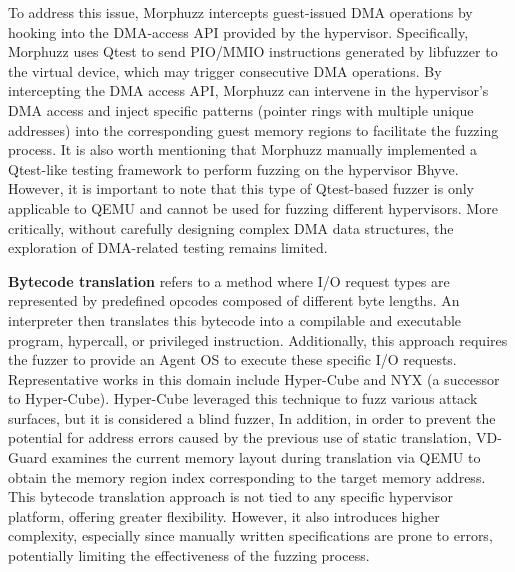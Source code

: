 \sloppy
To address this issue, Morphuzz \cite{bulekov2022morphuzz} intercepts guest-issued DMA operations by hooking into the DMA-access API provided by the hypervisor. Specifically, Morphuzz uses Qtest to send PIO/MMIO instructions generated by libfuzzer to the virtual device, which may trigger consecutive DMA operations. By intercepting the DMA access API, Morphuzz can intervene in the hypervisor's DMA access and inject specific patterns (\eg pointer rings with multiple unique addresses) into the corresponding guest memory regions to facilitate the fuzzing process. It is also worth mentioning that Morphuzz manually implemented a Qtest-like testing framework to perform fuzzing on the hypervisor Bhyve. 
However, it is important to note that this type of Qtest-based fuzzer is only applicable to QEMU and cannot be used for fuzzing different hypervisors. More critically, without carefully designing complex DMA data structures, the exploration of DMA-related testing remains limited.

\textbf{Bytecode translation} refers to a method where I/O request types are represented by predefined opcodes composed of different byte lengths. An interpreter then translates this bytecode into a compilable and executable program, hypercall, or privileged instruction. Additionally, this approach requires the fuzzer to provide an Agent OS to execute these specific I/O requests. Representative works in this domain include Hyper-Cube \cite{schumilo2020hyper} and NYX \cite{schumilo2021nyx} (a successor to Hyper-Cube). Hyper-Cube leveraged this technique to fuzz various attack surfaces, but it is considered a blind fuzzer,  In addition, in order to prevent the potential for address errors caused by the previous use of static translation, VD-Guard \cite{Liu2023VDGuard} examines the current memory layout during translation via QEMU to obtain the memory region index corresponding to the target memory address.  This bytecode translation approach is not tied to any specific hypervisor platform, offering greater flexibility. However, it also introduces higher complexity, especially since manually written specifications are prone to errors, potentially limiting the effectiveness of the fuzzing process.

